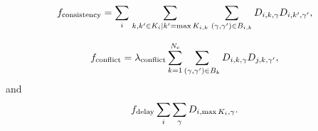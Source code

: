 
\begin{equation}
f_{\mathrm{consistency}}
=
\sum_i
\sum_{\left.k, k' \in K_i \middle| k' = \max K_{i, k}\right.}
\sum_{(\gamma, \gamma') \in B_{i, k}}
D_{i, k, \gamma} D_{i, k', \gamma'},
\end{equation}


\begin{equation}
f_{\mathrm{conflict}}
=
\lambda_{\mathrm{conflict}}
\sum_{k=1}^{N_{\mathrm{c}}}
\sum_{(\gamma, \gamma') \in B_k} D_{i, k, \gamma} D_{j, k, \gamma'},
\end{equation}
and
\begin{equation}
f_{\mathrm{delay}}
\sum_i \sum_{\gamma} D_{i, \max K_i, \gamma}.
\end{equation}
